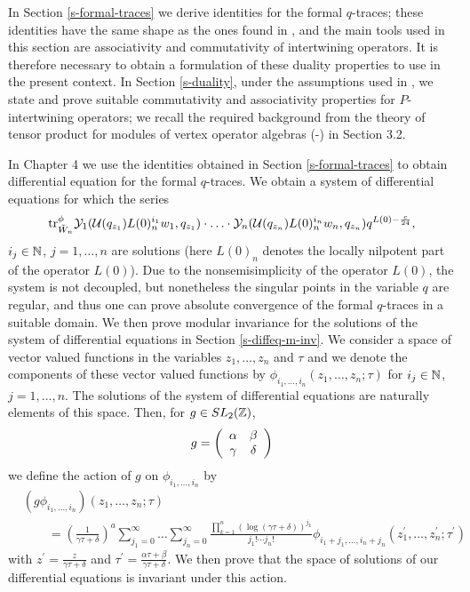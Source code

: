 \documentclass[12pt]{article}
\begin{document}
In Section \ref{s-formal-traces} we derive identities for the formal
$q$-traces; these identities have the same shape as the ones found in
\cite{H2}, and the main tools used in this section are associativity and
commutativity of intertwining operators. It is therefore necessary
to obtain a formulation of these duality properties to use in the
present context.
In Section \ref{s-duality}, under the assumptions used in \cite{HLZ7},
we state and prove suitable commutativity and associativity properties
for $P$-intertwining operators; we recall the required background from
the theory of tensor product for modules of vertex operator algebras
(\cite{HLZ1}-\cite{HLZ8}) in Section 3.2.

In Chapter 4 we use the identities obtained in Section \ref{s-formal-traces}
to obtain differential equation for the formal $q$-traces. We obtain a
system of differential equations for which the series
\begin{align*}
  \mbox{\rm tr}^\phi_{\tilde W_n} \mathcal{Y}_1(\mathcal{U}(q_{z_1})L(0)_n^{i_1}w_1, q_{z_1})\cdot \ldots
    \cdot \mathcal{Y}_n(\mathcal{U}(q_{z_n})L(0)_n^{i_n}w_n, q_{z_n}) q^{L(0)-\frac{c}{24}},
\end{align*}
$i_j\in \mathbb{N}$, $j=1,\ldots,n$ are solutions 
(here $L(0)_n$ denotes the locally nilpotent part of the operator $L(0)$).
Due to the nonsemisimplicity
of the operator $L(0)$, the system is not decoupled, but nonetheless
the singular points in the variable $q$ are regular, and thus one
can prove absolute convergence of the formal $q$-traces in a suitable
domain.
We then prove modular invariance for the solutions of the system
of differential equations in Section \ref{s-diffeq-m-inv}.
We consider a space of vector valued functions in the variables
$z_1,\ldots, z_n$ and $\tau$ and we denote the components of these
vector valued functions by $\phi_{i_1,\ldots,i_n}(z_1,\ldots, z_n; \tau)$ for
$i_j\in \mathbb{N}$, $j=1,\ldots, n$. The solutions of the system of differential
equations are naturally elements of this space. Then, for $g\in SL_2(\mathbb{Z})$,
$$
  g = \left(
    \begin{array}{c c}
      \alpha & \beta\\
      \gamma & \delta
    \end{array}
  \right)
$$
we define the action of $g$ on $\phi_{i_1,\ldots,i_n}$ by
\begin{align*}
  &(g\phi_{i_1,\ldots,i_n})(z_1,\ldots,z_n; \tau) \\
  &\qquad =\left(\frac{1}{\gamma \tau + \delta}\right)^a
    \sum_{j_1=0}^\infty \ldots \sum_{j_n=0}^\infty
    \frac{\prod_{k=1}^n(\log(\gamma\tau + \delta))^{j_k}}{j_1!\cdots j_n!}
    \phi_{i_1+j_1,\ldots,i_n+j_n}
      \left(z_1^\prime, \ldots, z_n^\prime; \tau^\prime\right)
\end{align*}
with $z^\prime = \frac{z}{\gamma \tau + \delta}$ and
$\tau^\prime = \frac{\alpha \tau + \beta}{\gamma \tau + \delta}$.
We then prove that the space of solutions of our differential
equations is invariant under this action.
\end{document}
